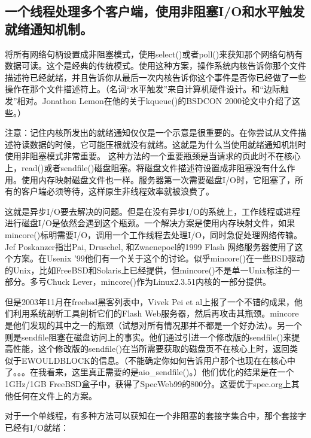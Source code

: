 \documentclass[twoside, xetex]{report}
\begin{document}
\subsection*{一个线程处理多个客户端，使用非阻塞I/O和水平触发就绪通知机制。}

	将所有网络句柄设置成非阻塞模式，使用select()或者poll()来获知那个网络句柄有数据可读。这个是经典的传统模式。使用这种方案，操作系统内核告诉你那个文件描述符已经就绪，并且告诉你从最后一次内核告诉你这个事件是否你已经做了一些操作在那个文件描述符上。（名词“水平触发”来自计算机硬件设计。和“边际触发”相对。Jonathon Lemon在他的关于kqueue()的BSDCON 2000论文中介绍了这些。）
	
	注意：记住内核所发出的就绪通知仅仅是一个示意是很重要的。在你尝试从文件描述符读数据的时候，它可能压根就没有就绪。这就是为什么当使用就绪通知机制时使用非阻塞模式非常重要。
	这种方法的一个重要瓶颈是当请求的页此时不在核心上，read()或者sendfile()磁盘阻塞。将磁盘文件描述符设置成非阻塞没有什么作用。使用内存映射磁盘文件也一样。服务器第一次需要磁盘I/O时，它阻塞了，所有的客户端必须等待，这样原生非线程效率就被浪费了。
	
	这就是异步I/O要去解决的问题。但是在没有异步I/O的系统上，工作线程或进程进行磁盘I/O是依然会遇到这个瓶颈。一个解决方案是使用内存映射文件，如果mincore()标明需要I/O，调用一个工作线程去处理I/O，同时急促处理网络传输。Jef Poskanzer指出Pai, Druschel, 和Zwaenepoel的1999 Flash 网络服务器使用了这个方案。在Usenix '99他们有一个关于这个的讨论。似乎mincore()在一些BSD驱动的Unix，比如FreeBSD和Solaris上已经提供，但mincore()不是单一Unix标注的一部分。多亏Chuck Lever，mincore()作为Linux2.3.51内核的一部分提供。
	
	但是2003年11月在freebsd黑客列表中，Vivek Pei et al上报了一个不错的成果，他们利用系统剖析工具剖析它们的Flash Web服务器，然后再攻击其瓶颈。mincore是他们发现的其中之一的瓶颈（试想对所有情况那并不都是一个好办法）。另一个则是sendfile阻塞在磁盘访问上的事实。他们通过引进一个修改版的sendfile()来提高性能，这个修改版的sendfile()在当所需要获取的磁盘页不在核心上时，返回类似于EWOULDBLOCK的信息。（不能确定你如何告诉用户那个也现在在核心中了。。。在我看来，这里真正需要的是aio\_sendfile()。）他们优化的结果是在一个1GHz/1GB FreeBSD盒子中，获得了SpecWeb99的800分。这要优于spec.org上其他任何在文件上的方案。

对于一个单线程，有多种方法可以获知在一个非阻塞的套接字集合中，那个套接字已经有I/O就绪：
\end{document}
